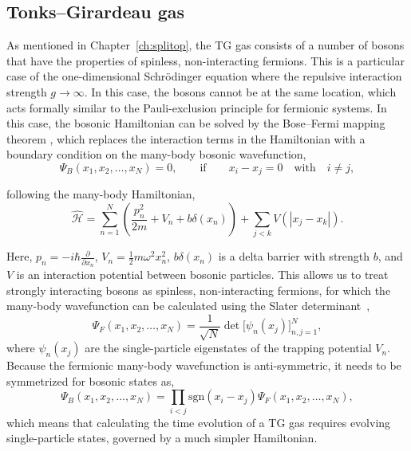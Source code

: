 \subsection{Tonks--Girardeau gas}

As mentioned in Chapter~\ref{ch:splitop}, the TG gas consists of a number of bosons that have the properties of spinless, non-interacting fermions.
This is a particular case of the one-dimensional Schr\"odinger equation where the repulsive interaction strength $g\rightarrow\infty$.
In this case, the bosons cannot be at the same location, which acts formally similar to the Pauli-exclusion principle for fermionic systems.
In this case, the bosonic Hamiltonian can be solved by the Bose--Fermi mapping theorem \cite{girardeau2001ground, girardeau2001measurement}, which replaces the interaction terms in the Hamiltonian with a boundary condition on the many-body bosonic wavefunction,
\begin{equation}
\Psi_B(x_1, x_2, \ldots, x_N) = 0,\qquad \mathrm{if}\qquad x_i - x_j = 0 \quad\textrm{with}\quad i \ne j,
\end{equation}

\noindent following the many-body Hamiltonian,
\begin{equation}
\mathcal{\hat H} = \sum_{n=1}^N\left(\frac{p_n^2}{2m} + V_n + b\delta(x_n)\right) + \sum_{j<k}V(|x_j - x_k|).
\end{equation}

\noindent Here, $p_n = -i\hbar\frac{\partial}{\partial x_n}$, $V_n = \frac{1}{2}m\omega^2x_n^2$, $b\delta(x_n)$ is a delta barrier with strength $b$, and $V$ is an interaction potential between bosonic particles.
This allows us to treat strongly interacting bosons as spinless, non-interacting fermions, for which the many-body wavefunction can be calculated using the Slater determinant~\cite{slater1929},
\begin{equation}
\Psi_F (x_1, x_2, \ldots, x_N) = \frac{1}{\sqrt{N}} \det\Big[\psi_n(x_j)\Big]_{n,j=1}^N,
\end{equation}
\noindent where $\psi_n(x_j)$ are the single-particle eigenstates of the trapping potential $V_n$.
Because the fermionic many-body wavefunction is anti-symmetric, it needs to be symmetrized for bosonic states as, 
\begin{equation}
\Psi_B(x_1, x_2, \ldots, x_N) =
\prod_{i < j}
\mathrm{sgn}(x_i - x_j)\Psi_F(x_1, x_2, \ldots, x_N),
\end{equation}
\noindent which means that calculating the time evolution of a TG gas requires evolving single-particle states, governed by a much simpler Hamiltonian.

